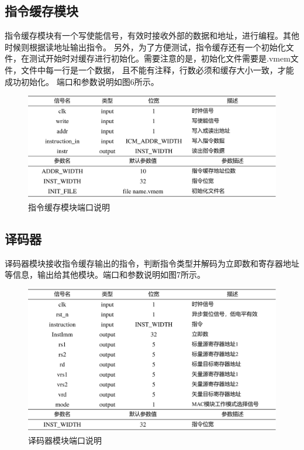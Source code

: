 \documentclass[UTF8]{ctexart}
\begin{document}
\subsection{指令缓存模块}
指令缓存模块有一个写使能信号，有效时接收外部的数据和地址，进行编程。其他时候则根据读地址输出指令。
另外，为了方便测试，指令缓存还有一个初始化文件，在测试开始时对缓存进行初始化。需要注意的是，初始化文件需要是.vmem文件，文件中每一行是一个数据，
且不能有注释，行数必须和缓存大小一致，才能成功初始化。
端口和参数说明如图6所示。

\begin{figure}[htbp]
    \centering
    \includegraphics[width=16cm]{pic/ICM.png}
    \caption{指令缓存模块端口说明}
\end{figure}

\subsection{译码器}
译码器模块接收指令缓存输出的指令，判断指令类型并解码为立即数和寄存器地址等信息，输出给其他模块。端口和参数说明如图7所示。

\begin{figure}[htbp]
    \centering
    \includegraphics[width=16cm]{pic/Decode.png}
    \caption{译码器模块端口说明}
\end{figure}
\end{document}
